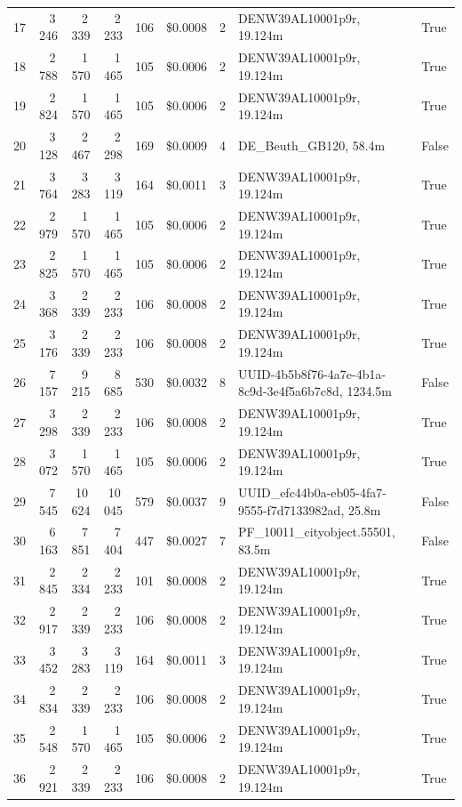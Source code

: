 \documentclass[a4paper,11pt]{article}
\begin{document}
\begin{table}[ht]
\begin{tabular}{r r r r r r r p{3cm} l}
17 & 3\,246 & 2\,339 & 2\,233 & 106 & \$0.0008 & 2 & DENW39AL10001p9r, 19.124m & True \\
18 & 2\,788 & 1\,570 & 1\,465 & 105 & \$0.0006 & 2 & DENW39AL10001p9r, 19.124m & True \\
19 & 2\,824 & 1\,570 & 1\,465 & 105 & \$0.0006 & 2 & DENW39AL10001p9r, 19.124m & True \\
20 & 3\,128 & 2\,467 & 2\,298 & 169 & \$0.0009 & 4 & DE\_Beuth\_GB120, 58.4m & False \\
21 & 3\,764 & 3\,283 & 3\,119 & 164 & \$0.0011 & 3 & DENW39AL10001p9r, 19.124m & True \\
22 & 2\,979 & 1\,570 & 1\,465 & 105 & \$0.0006 & 2 & DENW39AL10001p9r, 19.124m & True \\
23 & 2\,825 & 1\,570 & 1\,465 & 105 & \$0.0006 & 2 & DENW39AL10001p9r, 19.124m & True \\
24 & 3\,368 & 2\,339 & 2\,233 & 106 & \$0.0008 & 2 & DENW39AL10001p9r, 19.124m & True \\
25 & 3\,176 & 2\,339 & 2\,233 & 106 & \$0.0008 & 2 & DENW39AL10001p9r, 19.124m & True \\
26 & 7\,157 & 9\,215 & 8\,685 & 530 & \$0.0032 & 8 & UUID-4b5b8f76-4a7e-4b1a-8c9d-3e4f5a6b7c8d, 1234.5m & False \\
27 & 3\,298 & 2\,339 & 2\,233 & 106 & \$0.0008 & 2 & DENW39AL10001p9r, 19.124m & True \\
28 & 3\,072 & 1\,570 & 1\,465 & 105 & \$0.0006 & 2 & DENW39AL10001p9r, 19.124m & True \\
29 & 7\,545 & 10\,624 & 10\,045 & 579 & \$0.0037 & 9 & UUID\_efc44b0a-eb05-4fa7-9555-f7d7133982ad, 25.8m & False \\
30 & 6\,163 & 7\,851 & 7\,404 & 447 & \$0.0027 & 7 & PF\_10011\_cityobject.55501, 83.5m & False \\
31 & 2\,845 & 2\,334 & 2\,233 & 101 & \$0.0008 & 2 & DENW39AL10001p9r, 19.124m & True \\
32 & 2\,917 & 2\,339 & 2\,233 & 106 & \$0.0008 & 2 & DENW39AL10001p9r, 19.124m & True \\
33 & 3\,452 & 3\,283 & 3\,119 & 164 & \$0.0011 & 3 & DENW39AL10001p9r, 19.124m & True \\
34 & 2\,834 & 2\,339 & 2\,233 & 106 & \$0.0008 & 2 & DENW39AL10001p9r, 19.124m & True \\
35 & 2\,548 & 1\,570 & 1\,465 & 105 & \$0.0006 & 2 & DENW39AL10001p9r, 19.124m & True \\
36 & 2\,921 & 2\,339 & 2\,233 & 106 & \$0.0008 & 2 & DENW39AL10001p9r, 19.124m & True \\

\end{tabular}
\end{table}
\end{document}
